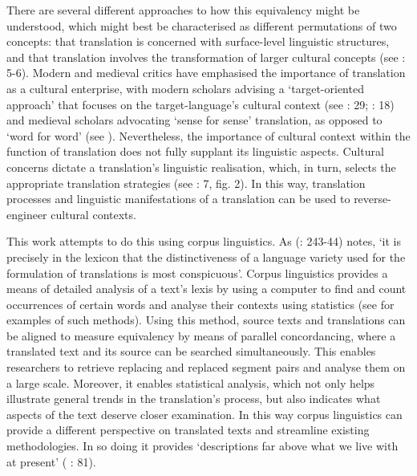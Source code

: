\documentclass{dhbenelux}
\begin{document}
There are several different approaches to how this equivalency might be
understood, which might best be characterised as different permutations
of two concepts: that translation is concerned with surface-level
linguistic structures, and that translation involves the transformation
of larger cultural concepts (see \citeauthor{baker1992} 
\citeyear{baker1992}: 5-6). Modern and medieval critics have emphasised 
the importance of translation as a cultural enterprise, with modern 
scholars advising a `target-oriented approach' that focuses on the 
target-language's cultural context (see \citeauthor{vermeer1987} 
\citeyear{vermeer1987}: 29; \citeauthor{toury2012} 
\citeyear{toury2012}: 18) and medieval scholars advocating `sense for
sense' translation, as opposed to `word for word' (see 
\citeauthor{copeland1991} \citeyear{copeland1991}). Nevertheless, the 
importance of cultural context within the function of translation does 
not fully supplant its linguistic aspects. Cultural concerns dictate a 
translation's linguistic realisation, which, in turn, selects the 
appropriate translation strategies (see \citeauthor{toury2012} 
\citeyear{toury2012}: 7, fig. 2). In this way, translation processes 
and linguistic manifestations of a translation can be used to 
reverse-engineer cultural contexts.

This work attempts to do this using corpus linguistics. As 
\citeauthor{toury2012} (\citeyear{toury2012}: 243-44) notes, `it is 
precisely in the lexicon that the distinctiveness of a language 
variety used for the formulation of translations is most conspicuous'. 
Corpus linguistics provides a means of detailed analysis of a text's 
lexis by using a computer to find and count occurrences of certain 
words and analyse their contexts using statistics (see 
\citeauthor{fantinoulizanettin2015} \citeyear{fantinoulizanettin2015} 
for examples of such methods). Using this method, source texts and 
translations can be aligned to measure equivalency by means of parallel 
concordancing, where a translated text and its source can be searched 
simultaneously. This enables researchers to retrieve replacing and 
replaced segment pairs and analyse them on a large scale. Moreover, it 
enables statistical analysis, which not only helps illustrate general 
trends in the translation's process, but also indicates what aspects 
of the text deserve closer examination. In this way corpus linguistics 
can provide a different perspective on translated texts and streamline 
existing methodologies. In so doing it provides `descriptions far above 
what we live with at present' (\citeauthor{sinclair2005} 
\citeyear{sinclair2005}: 81).
\end{document}

